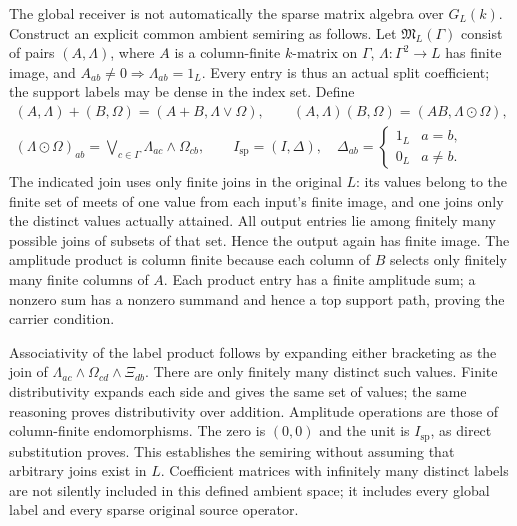 The global receiver is not automatically the
sparse matrix algebra over $G_L(k)$. Construct
an explicit common ambient semiring as follows.
Let $\mathfrak M_L(\Gamma)$ consist of pairs
$(A,\Lambda)$, where $A$ is a column-finite
$k$-matrix on $\Gamma$, $\Lambda:\Gamma^2\to L$
has finite image, and
$A_{ab}\ne0\Rightarrow\Lambda_{ab}=1_L$.
Every entry is thus an actual split coefficient;
the support labels may be dense in the index set.
Define
\begin{equation}\tag{CFP39}
\begin{gathered}
 (A,\Lambda)+(B,\Omega)=(A+B,\Lambda\vee\Omega),\qquad
 (A,\Lambda)(B,\Omega)=(AB,\Lambda\odot\Omega),\\
 (\Lambda\odot\Omega)_{ab}
        =\bigvee_{c\in\Gamma}\Lambda_{ac}\wedge\Omega_{cb},\qquad
 I_{\mathrm{sp}}=(I,\Delta),\quad
 \Delta_{ab}=\begin{cases}1_L&a=b,\\0_L&a\ne b.\end{cases}
\end{gathered}
\end{equation}
The indicated join uses only finite joins in
the original $L$: its values belong to the
finite set of meets of one value from each
input's finite image, and one joins only the
distinct values actually attained. All output
entries lie among finitely many possible
joins of subsets of that set. Hence the
output again has finite image. The amplitude
product is column finite because each column
of $B$ selects only finitely many finite
columns of $A$. Each product entry has a
finite amplitude sum; a nonzero sum has a
nonzero summand and hence a top support path,
proving the carrier condition.

Associativity of the label product follows
by expanding either bracketing as the join
of $\Lambda_{ac}\wedge\Omega_{cd}\wedge\Xi_{db}$.
There are only finitely many distinct such
values. Finite distributivity expands each
side and gives the same set of values; the
same reasoning proves distributivity over
addition. Amplitude operations are those of
column-finite endomorphisms. The zero is
$(0,0)$ and the unit is $I_{\mathrm{sp}}$,
as direct substitution proves. This establishes
the semiring without assuming that arbitrary
joins exist in $L$. Coefficient matrices with
infinitely many distinct labels are not
silently included in this defined ambient
space; it includes every global label and
every sparse original source operator.


